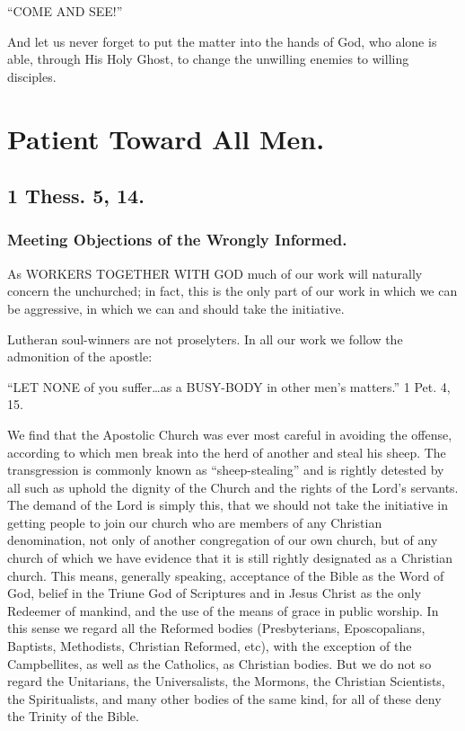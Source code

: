 \documentclass[
]{book}
\begin{document}
``COME AND SEE!''

And let us never forget to put the matter into the hands of God, who alone is able, through His Holy Ghost, to change the unwilling enemies to willing disciples.

\hypertarget{patient-toward-all-men.}{%
\chapter{Patient Toward All Men.}\label{patient-toward-all-men.}}

\hypertarget{thess.-5-14.}{%
\section*{1 Thess. 5, 14.}\label{thess.-5-14.}}

\hypertarget{meeting-objections-of-the-wrongly-informed.}{%
\subsection*{Meeting Objections of the Wrongly Informed.}\label{meeting-objections-of-the-wrongly-informed.}}

As WORKERS TOGETHER WITH GOD much of our work will naturally concern the unchurched; in fact, this is the only part of our work in which we can be aggressive, in which we can and should take the initiative.

Lutheran soul-winners are not proselyters. In all our work we follow the admonition of the apostle:

``LET NONE of you suffer\ldots as a BUSY-BODY in other men's matters.'' 1 Pet. 4, 15.

We find that the Apostolic Church was ever most careful in avoiding the offense, according to which men break into the herd of another and steal his sheep. The transgression is commonly known as ``sheep-stealing'' and is rightly detested by all such as uphold the dignity of the Church and the rights of the Lord's servants. The demand of the Lord is simply this, that we should not take the initiative in getting people to join our church who are members of any Christian denomination, not only of another congregation of our own church, but of any church of which we have evidence that it is still rightly designated as a Christian church. This means, generally speaking, acceptance of the Bible as the Word of God, belief in the Triune God of Scriptures and in Jesus Christ as the only Redeemer of mankind, and the use of the means of grace in public worship. In this sense we regard all the Reformed bodies (Presbyterians, Eposcopalians, Baptists, Methodists, Christian Reformed, etc), with the exception of the Campbellites, as well as the Catholics, as Christian bodies. But we do not so regard the Unitarians, the Universalists, the Mormons, the Christian Scientists, the Spiritualists, and many other bodies of the same kind, for all of these deny the Trinity of the Bible.
\end{document}

